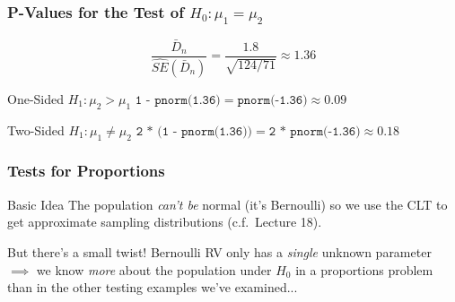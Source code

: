 \documentclass[handout]{beamer}
\begin{document}
\begin{frame}
\frametitle{P-Values for the Test of $H_0\colon \mu_1 = \mu_2$}

	$$\boxed{\displaystyle \frac{\bar{D}_n}{\widehat{SE}(\bar{D}_n)}= \frac{1.8}{\sqrt{124/71}} \approx 1.36} $$

\begin{block}{One-Sided $H_1\colon \mu_2 > \mu_1 $} 
$\texttt{1 - pnorm(1.36)} =  \texttt{pnorm(-1.36)}  \approx 0.09$ 
\end{block}

\begin{block}{Two-Sided $H_1 \colon \mu_1 \neq \mu_2$} 
$\texttt{2 * (1 - pnorm(1.36))} =  \texttt{2 * pnorm(-1.36)} \approx 0.18$
\end{block}
\end{frame}
\begin{frame}
	\frametitle{Tests for Proportions}
	\begin{block}
		{Basic Idea}
		The population \emph{can't be} normal (it's Bernoulli) so we use the CLT to get approximate sampling distributions (c.f.\ Lecture 18).
	\end{block}
	\begin{block}
		{But there's a small twist!}
		Bernoulli RV only has a \emph{single} unknown parameter $\implies$  we know \emph{more} about the population under $H_0$ in a proportions problem than in the other testing examples we've examined...	
	\end{block}

\vspace{1em}	

	\hfill\alert{}
\end{frame}
\end{document}
